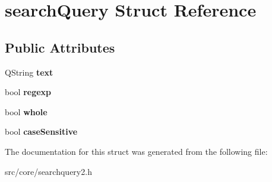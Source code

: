 \hypertarget{structsearchQuery}{
\section{searchQuery Struct Reference}
\label{structsearchQuery}
}
\subsection*{Public Attributes}
\begin{DoxyCompactItemize}
\item 
\hypertarget{structsearchQuery_a685f79ff454ccbb59c4b683713d8d857}{
QString {\bfseries text}}
\label{structsearchQuery_a685f79ff454ccbb59c4b683713d8d857}

\item 
\hypertarget{structsearchQuery_a9780bf35b82961c8f43660f3dfec0011}{
bool {\bfseries regexp}}
\label{structsearchQuery_a9780bf35b82961c8f43660f3dfec0011}

\item 
\hypertarget{structsearchQuery_a8f8cc469cd92de4984523f426be89027}{
bool {\bfseries whole}}
\label{structsearchQuery_a8f8cc469cd92de4984523f426be89027}

\item 
\hypertarget{structsearchQuery_ac492443fd1a1f16148c0d47ce6704e31}{
bool {\bfseries caseSensitive}}
\label{structsearchQuery_ac492443fd1a1f16148c0d47ce6704e31}

\end{DoxyCompactItemize}


The documentation for this struct was generated from the following file:\begin{DoxyCompactItemize}
\item 
src/core/searchquery2.h\end{DoxyCompactItemize}
